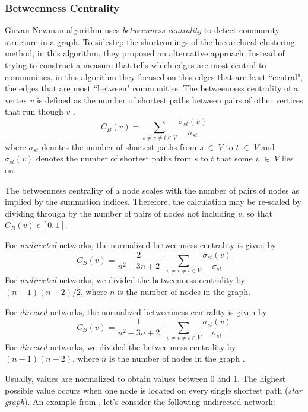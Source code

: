 \subsubsection*{Betweenness Centrality}\label{betweennesscentrality}
Girvan-Newman algorithm uses \textit{betweenness centrality} to detect community structure in a graph. To sidestep the shortcomings of the hierarchical clustering method, in this algorithm, they proposed an alternative approach. Instead of trying to construct a measure that tells which edges are most central to communities, in this algorithm they focused on this edges that are least ``central", the edges that are most ``between" communities. The betweenness centrality of a vertex $v$ is defined as the number of shortest paths between pairs of other vertices that run though $v$ \cite{ref-11}. 
\begin{equation}
C_B(v) = \sum\limits_{s \neq v \neq t \in V} \dfrac{\sigma_{st}(v)}{\sigma_{st}}
\end{equation}
where $\sigma_{st}$ denotes the number of shortest paths from $s \; \in \; V$ to $t \; \in \; V$ and $\sigma_{st}(v)$ denotes the number of shortest paths from $s$ to $t$ that some $v \; \in \; V$ lies on. 

The betweenness centrality of a node scales with the number of pairs of nodes as implied by the summation indices. Therefore, the calculation may be re-scaled by dividing through by the number of pairs of nodes not including $v$, so that $C_B(v) \; \epsilon \; [0,1]$.

For \textit{undirected} networks, the normalized betweenness centrality is given by
\begin{equation}
C_B(v) = \dfrac{2}{n^2 - 3n + 2} \cdot \sum\limits_{s \neq v \neq t \in V} \dfrac{\sigma_{st}(v)}{\sigma_{st}}
\end{equation}
For \textit{undirected} networks, we divided the betweenness centrality by $(n - 1)(n - 2) / 2$, where $n$ is the number of nodes in the graph.

For \textit{directed} networks, the normalized betweenness centrality is given by
\begin{equation}
C_B(v) = \dfrac{1}{n^2 - 3n + 2} \cdot \sum\limits_{s \neq v \neq t \in V} \dfrac{\sigma_{st}(v)}{\sigma_{st}}
\end{equation}
For \textit{directed} networks, we divided the betweenness centrality by $(n - 1)(n - 2)$, where $n$ is the number of nodes in the graph \cite{ref-17}.

Usually, values are normalized to obtain values between 0 and 1. The highest possible value occurs when one node is located on every single shortest path (\textit{star graph}). An example from \cite{ref-17}, let's consider the following undirected network:

